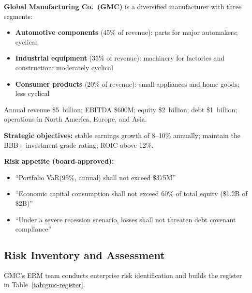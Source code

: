 \documentclass[11pt,openany]{book}
\providecommand{\tightlist}{\setlength{\itemsep}{0pt}\setlength{\parskip}{0pt}}
\begin{document}
\textbf{Global Manufacturing Co.\ (GMC)} is a diversified manufacturer with
three segments:
\begin{itemize}\tightlist
  \item \textbf{Automotive components} (45\% of revenue): parts for major
        automakers; cyclical
  \item \textbf{Industrial equipment} (35\% of revenue): machinery for
        factories and construction; moderately cyclical
  \item \textbf{Consumer products} (20\% of revenue): small appliances and
        home goods; less cyclical
\end{itemize}

Annual revenue \$5~billion; EBITDA \$600M; equity \$2~billion; debt
\$1~billion; operations in North America, Europe, and Asia.

\textbf{Strategic objectives:} stable earnings growth of 8--10\% annually;
maintain the BBB+ investment-grade rating; ROIC above 12\%.

\textbf{Risk appetite (board-approved):}
\begin{itemize}\tightlist
  \item ``Portfolio VaR(95\%, annual) shall not exceed \$375M''
  \item ``Economic capital consumption shall not exceed 60\% of total equity
        (\$1.2B of \$2B)''
  \item ``Under a severe recession scenario, losses shall not threaten debt
        covenant compliance''
\end{itemize}

\subsection{Risk Inventory and Assessment}
\label{subsec:gmc-inventory}

GMC's ERM team conducts enterprise risk identification and builds the register
in Table~\ref{tab:gmc-register}.
\end{document}
